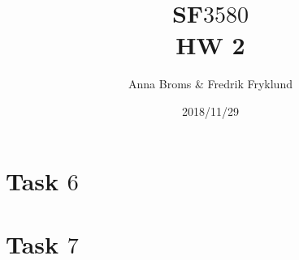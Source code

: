 \documentclass[a4paper]{article}
\title{SF$3580$\\HW 2}
\author{Anna Broms \& Fredrik Fryklund}
\date{2018/11/29}
\begin{document}
\maketitle

% 
%
% 
% 
 \section{Task $6$}
 
\section{Task $7$}






\end{document}

